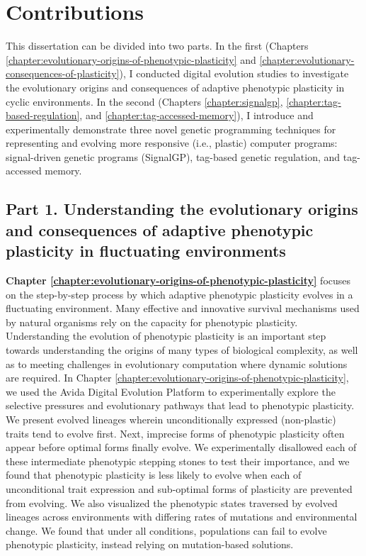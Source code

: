 \section{Contributions}


This dissertation can be divided into two parts.
In the first (Chapters \ref{chapter:evolutionary-origins-of-phenotypic-plasticity} and \ref{chapter:evolutionary-consequences-of-plasticity}), I conducted digital evolution studies to investigate the evolutionary origins and consequences of adaptive phenotypic plasticity in cyclic environments.
In the second (Chapters \ref{chapter:signalgp}, \ref{chapter:tag-based-regulation}, and \ref{chapter:tag-accessed-memory}), I introduce and experimentally demonstrate three novel genetic programming techniques for representing and evolving more responsive (i.e., plastic) computer programs: signal-driven genetic programs (SignalGP), tag-based genetic regulation, and tag-accessed memory.


\subsection{Part 1. Understanding the evolutionary origins and consequences of adaptive phenotypic plasticity in fluctuating environments}

\textbf{Chapter \ref{chapter:evolutionary-origins-of-phenotypic-plasticity}} focuses on the step-by-step process by which adaptive phenotypic plasticity evolves in a fluctuating environment.
Many effective and innovative survival mechanisms used by natural organisms rely on the capacity for phenotypic plasticity.
Understanding the evolution of phenotypic plasticity is an important step towards understanding the origins of many types of biological complexity, as well as to meeting challenges in evolutionary computation where dynamic solutions are required.
In Chapter \ref{chapter:evolutionary-origins-of-phenotypic-plasticity}, we used the Avida Digital Evolution Platform to experimentally explore the selective pressures and evolutionary pathways that lead to phenotypic plasticity.  
We present evolved lineages wherein unconditionally expressed (non-plastic) traits tend to evolve first.
Next, imprecise forms of phenotypic plasticity often appear before optimal forms finally evolve.   
We experimentally disallowed each of these intermediate phenotypic stepping stones to test their importance, and we found that phenotypic plasticity is less likely to evolve when each of unconditional trait expression and sub-optimal forms of plasticity are prevented from evolving. 
We also visualized the phenotypic states traversed by evolved lineages across environments with differing rates of mutations and environmental change. 
We found that under all conditions, populations can fail to evolve phenotypic plasticity, instead relying on mutation-based solutions.

